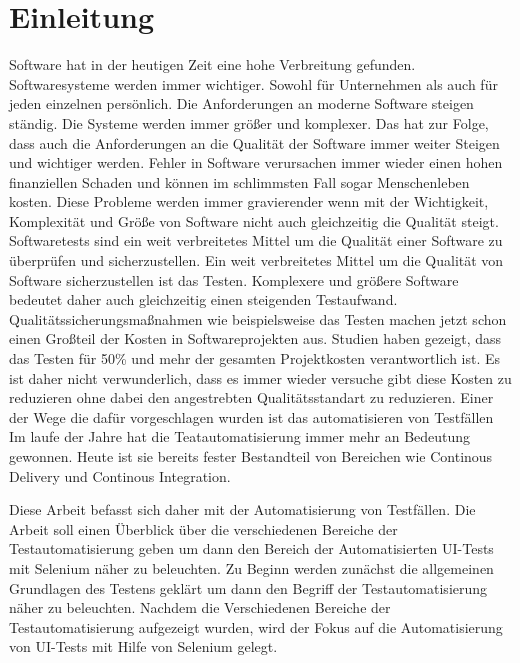 \chapter{Einleitung}
\label{sec:einleitung}

Software hat in der heutigen Zeit eine hohe Verbreitung gefunden. Softwaresysteme werden immer wichtiger. Sowohl für Unternehmen als auch für jeden einzelnen persönlich. Die Anforderungen an moderne Software steigen ständig. Die Systeme werden immer größer und komplexer. Das hat zur Folge, dass auch die Anforderungen an die Qualität der Software immer weiter Steigen und wichtiger werden.
Fehler in Software verursachen immer wieder einen hohen finanziellen Schaden und können im schlimmsten Fall sogar Menschenleben kosten. Diese Probleme werden immer gravierender wenn mit der Wichtigkeit, Komplexität und Größe von Software nicht auch gleichzeitig die Qualität steigt. \cite{burnstein_practical_2003} \newline
Softwaretests sind ein weit verbreitetes Mittel um die Qualität einer Software zu überprüfen und sicherzustellen. Ein weit verbreitetes Mittel um die Qualität von Software sicherzustellen ist das Testen.
Komplexere und größere Software bedeutet daher auch gleichzeitig einen steigenden Testaufwand.\newline
Qualitätssicherungsmaßnahmen wie beispielsweise das Testen machen jetzt schon einen Großteil der Kosten in Softwareprojekten aus. Studien haben gezeigt, dass das Testen für 50\% und mehr der gesamten Projektkosten verantwortlich ist. \cite{ramler_economic_2006} 
Es ist daher nicht verwunderlich, dass es immer wieder versuche gibt diese Kosten zu reduzieren ohne dabei den angestrebten Qualitätsstandart zu reduzieren.
Einer der Wege die dafür vorgeschlagen wurden ist das automatisieren von Testfällen 
\cite{harrold_testing:_2000}
Im laufe der Jahre hat die Teatautomatisierung immer mehr an Bedeutung gewonnen. Heute ist sie bereits fester Bestandteil von Bereichen wie Continous Delivery und Continous Integration.

Diese Arbeit befasst sich daher mit der Automatisierung von Testfällen. Die Arbeit soll einen Überblick über die verschiedenen Bereiche der Testautomatisierung geben um dann den Bereich der Automatisierten UI-Tests mit Selenium näher zu beleuchten.
Zu Beginn werden zunächst die allgemeinen Grundlagen des Testens geklärt um dann den Begriff der Testautomatisierung näher zu beleuchten. Nachdem die Verschiedenen Bereiche der Testautomatisierung aufgezeigt wurden, wird der Fokus auf die Automatisierung von UI-Tests mit Hilfe von Selenium gelegt.





